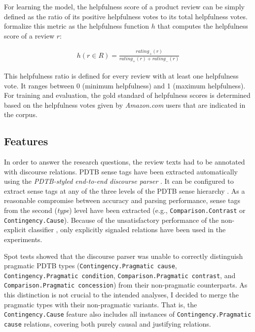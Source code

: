 \documentclass[
    a4paper,%
    12pt,%
    oneside,%
    toc=bibliography,
    final,
]{scrartcl}
\begin{document}
For learning the model, the helpfulness score of a product review can be simply defined as the ratio of its positive helpfulness votes to its total helpfulness votes. \citet[424]{Kim2006} formalize this metric as the helpfulness function $ h $ that computes the helpfulness score of a review $ r $:

\vspace{-2em}

\begin{align}
\label{helpfulness-fuction}
h(r \in R) = \frac{rating_+(r)}{rating_+(r) + rating_-(r)}
\end{align}

This helpfulness ratio is defined for every review with at least one helpfulness vote. It ranges between 0 (minimum helpfulness) and 1 (maximum helpfulness). For training and evaluation, the gold standard of helpfulness scores is determined based on the helpfulness votes given by \textit{Amazon.com} users that are indicated in the corpus.

\subsection{Features}

In order to answer the research questions, the review texts had to be annotated with discourse relations. PDTB sense tags have been extracted automatically using the \textit{PDTB-styled end-to-end discourse parser} \citep{Lin2014}. It can be configured to extract sense tags at any of the three levels of the PDTB sense hierarchy \citep[cf.][5]{Prasad2008}. As a reasonable compromise between accuracy and parsing performance, sense tags from the second (\textit{type}) level have been extracted (e.g., \lstinline|Comparison.Contrast| or \lstinline|Contingency.Cause|). Because of the unsatisfactory performance of the non-explicit classifier \citep[cf.][175]{Lin2014}, only explicitly signaled relations have been used in the experiments.


\begin{sloppypar}
Spot tests showed that the discourse parser was unable to correctly distinguish pragmatic PDTB types (\lstinline|Contingency.Pragmatic cause|, \lstinline|Contingency.Pragmatic condition|, \lstinline|Comparison.Pragmatic contrast|, and \lstinline|Comparison.Pragmatic concession|) from their non-pragmatic counterparts. As this distinction is not crucial to the intended analyses, I decided to merge the pragmatic types with their non-pragmatic variants. That is, the \lstinline|Contingency.Cause| feature also includes all instances of \lstinline|Contingency.Pragmatic cause| relations, covering both purely causal and justifying relations.
\end{sloppypar}
\end{document}

